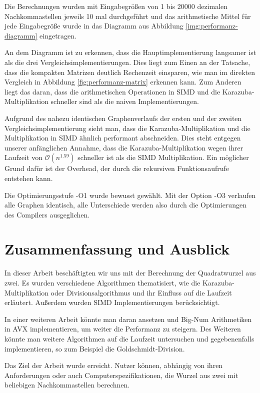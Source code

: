 \documentclass[course=erap]{aspdoc}
\begin{document}
Die Berechnungen wurden mit Eingabegrößen von 1 bis 20000 dezimalen Nachkommastellen jeweils 10 mal durchgeführt und das arithmetische Mittel für jede Eingabegröße wurde in das Diagramm aus Abbildung \ref{img:performanz-diagramm} 
eingetragen.

An dem Diagramm ist zu erkennen, dass die Hauptimplementierung langsamer ist als die drei Vergleichsimplementierungen. Dies liegt zum Einen an der Tatsache, dass die kompakten Matrizen deutlich Rechenzeit einsparen, wie man im direkten Vergleich in Abbildung \ref{fig:performanz-matrix} erkennen kann. Zum 
Anderen liegt das daran, dass die arithmetischen Operationen in SIMD und die Karazuba-Multiplikation schneller sind als die naiven Implementierungen. \par
Aufgrund des nahezu identischen Graphenverlaufs der ersten und der zweiten Vergleichsimplementierung sieht man, dass die Karazuba-Multiplikation und die Multiplikation in SIMD ähnlich performant abschneiden. Dies steht 
entgegen unserer anfänglichen Annahme, dass die Karazuba-Multiplikation wegen ihrer Laufzeit von $\mathcal{O}(n^{1.59})$ schneller ist als die SIMD Multiplikation. Ein möglicher Grund dafür ist der Overhead, der durch die rekursiven 
Funktionsaufrufe entstehen kann.

Die Optimierungsstufe -O1 wurde bewusst gewählt. Mit der Option -O3 verlaufen alle Graphen identisch, alle Unterschiede werden also durch die Optimierungen des Compilers ausgeglichen.

\section{Zusammenfassung und Ausblick} \label{sec:zusammenfassung}
In dieser Arbeit beschäftigten wir uns mit der Berechnung der Quadratwurzel aus zwei. Es wurden verschiedene Algorithmen thematisiert, wie die Karazuba-Multiplikation oder Divisionsalgorithmus und ihr Einfluss auf die Laufzeit erläutert. Außerdem wurden SIMD Implementierungen berücksichtigt. \par
In einer weiteren Arbeit könnte man daran ansetzen und Big-Num Arithmetiken in AVX implementieren, um weiter die Performanz zu steigern. Des Weiteren könnte man weitere Algorithmen auf die Laufzeit untersuchen und gegebenenfalls implementieren, so zum Beispiel die Goldschmidt-Division. \par
Das Ziel der Arbeit wurde erreicht. Nutzer können, abhängig von ihren Anforderungen oder auch Computerspezifikationen, die Wurzel aus zwei mit beliebigen Nachkommastellen berechnen.


{}
\end{document}

